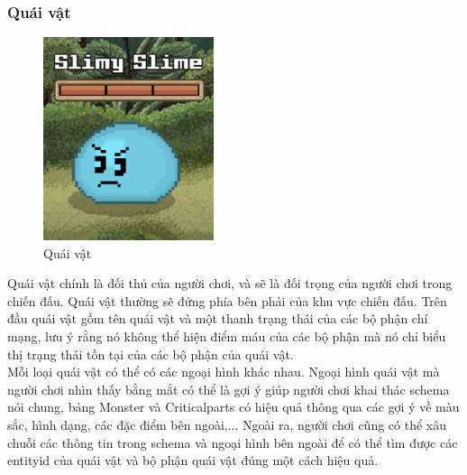 \subsubsection{Quái vật}
\begin{figure}[H]
	\centering
	\includegraphics[width=5cm]{Images/Monster.png}
	\vspace{0.5cm}
	\caption{Quái vật}
\end{figure}
\hspace*{1cm} Quái vật chính là đối thủ của người chơi, và sẽ là đối trọng của người chơi trong chiến đấu. Quái vật thường sẽ đứng phía bên phải của khu vực chiến đấu. Trên đầu quái vật gồm tên quái vật và một thanh trạng thái của các bộ phận chí mạng, lưu ý rằng nó không thể hiện điểm máu của các bộ phận mà nó chỉ biểu thị trạng thái tồn tại của các bộ phận của quái vật.\\
\hspace*{1cm} Mỗi loại quái vật có thể có các ngoại hình khác nhau. Ngoại hình quái vật mà người chơi nhìn thấy bằng mắt có thể là gợi ý giúp người chơi khai thác schema nói chung, bảng Monster và Criticalparts có hiệu quả thông qua các gợi ý về màu sắc, hình dạng, các đặc điểm bên ngoài,... Ngoài ra, người chơi cũng có thể xâu chuỗi các thông tin trong schema và ngoại hình bên ngoài để có thể tìm được các entityid của quái vật và bộ phận quái vật đúng một cách hiệu quả.

